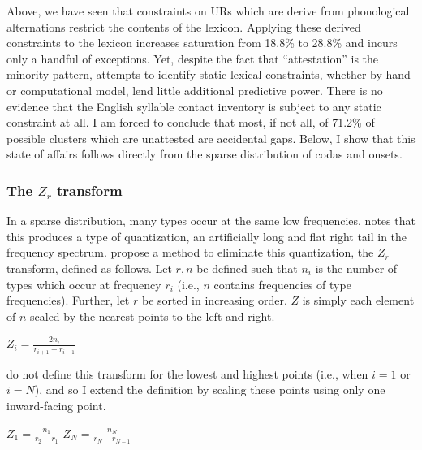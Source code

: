 
Above, we have seen that constraints on URs which are derive from phonological alternations restrict the contents of the lexicon. Applying these derived constraints to the lexicon increases saturation from 18.8\% to 28.8\% and incurs only a handful of exceptions. Yet, despite the fact that ``attestation'' is the minority pattern, attempts to identify static lexical constraints, whether by hand or computational model, lend little additional predictive power. There is no evidence that the English syllable contact inventory is subject to any static constraint at all. I am forced to conclude that most, if not all, of 71.2\% of possible clusters which are unattested are accidental gaps. Below, I show that this state of affairs follows directly from the sparse distribution of codas and onsets. 

\subsubsection{The $Z_r$ transform}

In a sparse distribution, many types occur at the same low frequencies. \citet{Good1953} notes that this produces a type of quantization, an artificially long and flat right tail in the frequency spectrum. \citet[][29]{Church1991} propose a method to eliminate this quantization, the $Z_r$ transform, defined as follows.
Let $r, n$ be defined such that $n_i$ is the number of types which occur at frequency $r_i$ (i.e., $n$ contains frequencies of type frequencies). Further, let $r$ be sorted in increasing order. $Z$ is simply each element of $n$ scaled by the nearest points to the left and right. 

\ex $\displaystyle Z_i = \frac{2 n_i}{r_{i + 1} - r_{i - 1}}$ \xe 

\noindent
\citeauthor{Church1991} do not define this transform for the lowest and highest points (i.e., when $i = 1$ or $i = N$), and so I extend the definition by scaling these points using only one inward-facing point.

\ex $\displaystyle Z_1 = \frac{n_1}{r_2 - r_1}$ \xe
\ex $\displaystyle Z_N = \frac{n_N}{r_N - r_{N - 1}}$ \xe



